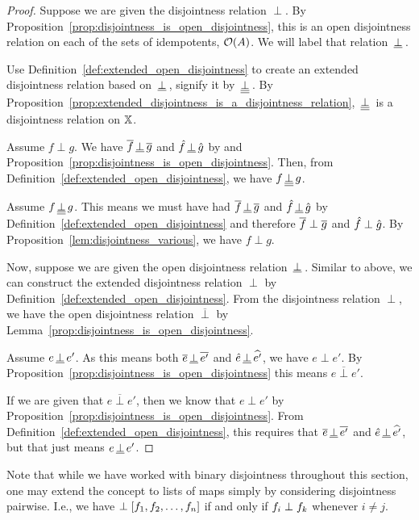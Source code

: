 \begin{proof}
  Suppose we are given the disjointness relation $\perp$. By
  Proposition~\ref{prop:disjointness_is_open_disjointness}, this is an open disjointness relation
  on each of the sets of idempotents, $\mathcal{O}({A})$. We will label that relation $\,\underline{\perp}\,$.

  Use Definition~\ref{def:extended_open_disjointness} to create an extended
  disjointness relation based on $\,\underline{\perp}\,$, signify it by $\,\underline{\underline{\perp}}\,$.
  By Proposition~\ref{prop:extended_disjointness_is_a_disjointness_relation}, $\,\underline{\underline{\perp}}\,$ is
  a disjointness relation on $\mathbb{X}$.

  Assume $f\perp g$. We have $\overline{f}\,\underline{\perp}\,\overline{g}$ and $\hat{f}\,\underline{\perp}\,\hat{g}$ by
   and Proposition~\ref{prop:disjointness_is_open_disjointness}. Then, from
  Definition~\ref{def:extended_open_disjointness}, we have $f \,\underline{\underline{\perp}}\, g$.

  Assume $f \,\underline{\underline{\perp}}\, g$. This means we must have had $\overline{f}\,\underline{\perp}\,\overline{g}$ and
  $\hat{f}\,\underline{\perp}\,\hat{g}$
  by Definition~\ref{def:extended_open_disjointness} and therefore $\overline{f}\perp\overline{g}$ and
  $\hat{f}\perp\hat{g}$. By Proposition~\ref{lem:disjointness_various}, we have $f \perp g$.


  Now, suppose we are given the open disjointness relation $\,\underline{\perp}\,$. Similar to above, we can
  construct the extended disjointness relation $\perp$ by
  Definition~\ref{def:extended_open_disjointness}. From the disjointness relation $\perp$, we have
  the open disjointness relation $\overline{\perp}$ by
  Lemma~\ref{prop:disjointness_is_open_disjointness}.

  Assume $e \,\underline{\perp}\, e'$. As this means both $\overline{e} \,\underline{\perp}\, \overline{e'}$ and
  $\hat{e} \,\underline{\perp}\, \widehat{e'}$, we have $e \perp e'$. By
  Proposition~\ref{prop:disjointness_is_open_disjointness} this means $e \overline{\perp} e'$.

  If we are given that $e \overline{\perp} e'$, then we know that $e \perp e'$ by
  Proposition~\ref{prop:disjointness_is_open_disjointness}. From
  Definition~\ref{def:extended_open_disjointness}, this requires that $\overline{e} \,\underline{\perp}\, \overline{e'}$
  and $\hat{e} \,\underline{\perp}\, \widehat{e'}$, but that just means $e \,\underline{\perp}\, e'$.
\end{proof}

Note that while we have worked with binary disjointness throughout this section, one may extend
the concept to lists of maps simply by considering disjointness pairwise. I.e., we have
$\perp [f_1,f_2,\ldots,f_n]$ if and only if $f_i \perp f_k$ whenever $i \ne j$.


